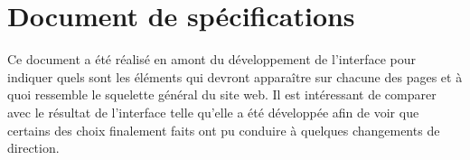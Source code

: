 \chapter{\label{Spécifications}Document de spécifications}
	Ce document a été réalisé en amont du développement de l'interface pour indiquer quels sont les éléments qui devront apparaître sur chacune des pages et à quoi ressemble le squelette général du site web. Il est intéressant de comparer avec le résultat de l'interface telle qu'elle a été développée afin de voir que certains des choix finalement faits ont pu conduire à quelques changements de direction.
	
	\begin{landscape}
		
	\end{landscape}
	


